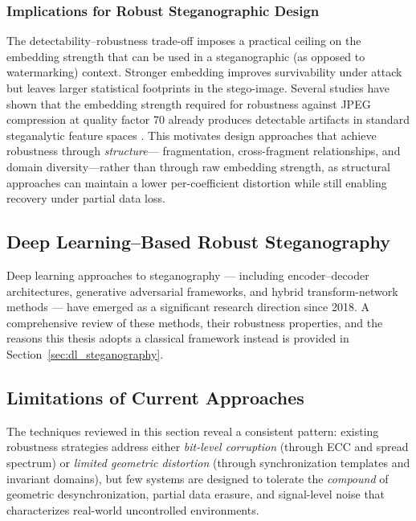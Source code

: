 \documentclass[12pt,a4paper,oneside]{report}
\begin{document}
	\subsubsection{Implications for Robust Steganographic Design}
	
	The detectability–robustness trade-off imposes a practical ceiling on the embedding
	strength that can be used in a steganographic (as opposed to watermarking) context.
	Stronger embedding improves survivability under attack but leaves larger statistical
	footprints in the stego-image.
	Several studies have shown that the embedding strength required for robustness against
	JPEG compression at quality factor 70 already produces detectable artifacts in standard
	steganalytic feature spaces \cite{Fridrich2012, petitcolas1999information}.
	This motivates design approaches that achieve robustness through \emph{structure}—
	fragmentation, cross-fragment relationships, and domain diversity—rather than through
	raw embedding strength, as structural approaches can maintain a lower per-coefficient
	distortion while still enabling recovery under partial data loss.
	
	\subsection{Deep Learning–Based Robust Steganography}
	\label{subsec:deep_learning}
	
	Deep learning approaches to steganography — including encoder–decoder architectures,
	generative adversarial frameworks, and hybrid transform-network methods — have
	emerged as a significant research direction since 2018. A comprehensive review of these
	methods, their robustness properties, and the reasons this thesis adopts a classical
	framework instead is provided in Section~\ref{sec:dl_steganography}.
	
	\subsection{Limitations of Current Approaches}
	\label{subsec:gap_revisited}
	
	The techniques reviewed in this section reveal a consistent pattern: existing robustness
	strategies address either \emph{bit-level corruption} (through ECC and spread spectrum)
	or \emph{limited geometric distortion} (through synchronization templates and
	invariant domains), but few systems are designed to tolerate the \emph{compound} of
	geometric desynchronization, partial data erasure, and signal-level noise that
	characterizes real-world uncontrolled environments.
	
\end{document}
